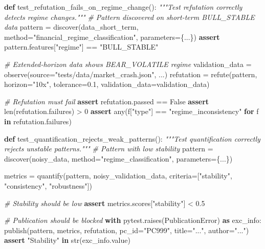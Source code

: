 \documentclass[
]{article}
\newenvironment{Shaded}{}{}
\newcommand{\BuiltInTok}[1]{\textcolor[rgb]{0.00,0.50,0.00}{#1}}
\newcommand{\CommentTok}[1]{\textcolor[rgb]{0.38,0.63,0.69}{\textit{#1}}}
\newcommand{\ControlFlowTok}[1]{\textcolor[rgb]{0.00,0.44,0.13}{\textbf{#1}}}
\newcommand{\DecValTok}[1]{\textcolor[rgb]{0.25,0.63,0.44}{#1}}
\newcommand{\FloatTok}[1]{\textcolor[rgb]{0.25,0.63,0.44}{#1}}
\newcommand{\ImportTok}[1]{\textcolor[rgb]{0.00,0.50,0.00}{\textbf{#1}}}
\newcommand{\KeywordTok}[1]{\textcolor[rgb]{0.00,0.44,0.13}{\textbf{#1}}}
\newcommand{\NormalTok}[1]{#1}
\newcommand{\OperatorTok}[1]{\textcolor[rgb]{0.40,0.40,0.40}{#1}}
\newcommand{\StringTok}[1]{\textcolor[rgb]{0.25,0.44,0.63}{#1}}
\newcommand{\VariableTok}[1]{\textcolor[rgb]{0.10,0.09,0.49}{#1}}
\begin{document}
\begin{Shaded}
\begin{Highlighting}[]
\KeywordTok{def}\NormalTok{ test\_refutation\_fails\_on\_regime\_change():}
    \CommentTok{"""Test refutation correctly detects regime changes."""}
    \CommentTok{\# Pattern discovered on short{-}term BULL\_STABLE data}
\NormalTok{    pattern }\OperatorTok{=}\NormalTok{ discover(data\_short\_term, method}\OperatorTok{=}\StringTok{"financial\_regime\_classification"}\NormalTok{, parameters}\OperatorTok{=}\NormalTok{\{...\})}
    \ControlFlowTok{assert}\NormalTok{ pattern.features[}\StringTok{"regime"}\NormalTok{] }\OperatorTok{==} \StringTok{"BULL\_STABLE"}

    \CommentTok{\# Extended{-}horizon data shows BEAR\_VOLATILE regime}
\NormalTok{    validation\_data }\OperatorTok{=}\NormalTok{ observe(source}\OperatorTok{=}\StringTok{"tests/data/market\_crash.json"}\NormalTok{, ...)}
\NormalTok{    refutation }\OperatorTok{=}\NormalTok{ refute(pattern, horizon}\OperatorTok{=}\StringTok{"10x"}\NormalTok{, tolerance}\OperatorTok{=}\FloatTok{0.1}\NormalTok{, validation\_data}\OperatorTok{=}\NormalTok{validation\_data)}

    \CommentTok{\# Refutation must fail}
    \ControlFlowTok{assert}\NormalTok{ refutation.passed }\OperatorTok{==} \VariableTok{False}
    \ControlFlowTok{assert} \BuiltInTok{len}\NormalTok{(refutation.failures) }\OperatorTok{\textgreater{}} \DecValTok{0}
    \ControlFlowTok{assert} \BuiltInTok{any}\NormalTok{(f[}\StringTok{"type"}\NormalTok{] }\OperatorTok{==} \StringTok{"regime\_inconsistency"} \ControlFlowTok{for}\NormalTok{ f }\KeywordTok{in}\NormalTok{ refutation.failures)}

\KeywordTok{def}\NormalTok{ test\_quantification\_rejects\_weak\_patterns():}
    \CommentTok{"""Test quantification correctly rejects unstable patterns."""}
    \CommentTok{\# Pattern with low stability}
\NormalTok{    pattern }\OperatorTok{=}\NormalTok{ discover(noisy\_data, method}\OperatorTok{=}\StringTok{"regime\_classification"}\NormalTok{, parameters}\OperatorTok{=}\NormalTok{\{...\})}

\NormalTok{    metrics }\OperatorTok{=}\NormalTok{ quantify(pattern, noisy\_validation\_data, criteria}\OperatorTok{=}\NormalTok{[}\StringTok{"stability"}\NormalTok{, }\StringTok{"consistency"}\NormalTok{, }\StringTok{"robustness"}\NormalTok{])}

    \CommentTok{\# Stability should be low}
    \ControlFlowTok{assert}\NormalTok{ metrics.scores[}\StringTok{"stability"}\NormalTok{] }\OperatorTok{\textless{}} \FloatTok{0.5}

    \CommentTok{\# Publication should be blocked}
    \ControlFlowTok{with}\NormalTok{ pytest.raises(PublicationError) }\ImportTok{as}\NormalTok{ exc\_info:}
\NormalTok{        publish(pattern, metrics, refutation, pc\_id}\OperatorTok{=}\StringTok{"PC999"}\NormalTok{, title}\OperatorTok{=}\StringTok{"..."}\NormalTok{, author}\OperatorTok{=}\StringTok{"..."}\NormalTok{)}
    \ControlFlowTok{assert} \StringTok{"Stability"} \KeywordTok{in} \BuiltInTok{str}\NormalTok{(exc\_info.value)}
\end{Highlighting}
\end{Shaded}
\end{document}
